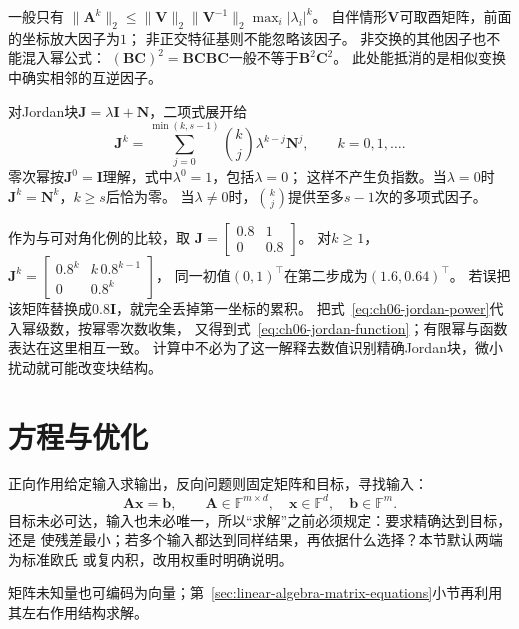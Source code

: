 一般只有
$\lVert\bm A^k\rVert_2\leq
\lVert\bm V\rVert_2\lVert\bm V^{-1}\rVert_2\max_i|\lambda_i|^k$。
自伴情形$\bm V$可取酉矩阵，前面的坐标放大因子为$1$；
非正交特征基则不能忽略该因子。
非交换的其他因子也不能混入幂公式：
$(\bm B\bm C)^2=\bm B\bm C\bm B\bm C$一般不等于$\bm B^2\bm C^2$。
此处能抵消的是相似变换中确实相邻的互逆因子。


对Jordan块$\bm J=\lambda\bm I+\bm N$，二项式展开给
\begin{equation}
 \bm J^k=\sum_{j=0}^{\min(k,s-1)}
       \binom{k}{j}\lambda^{k-j}\bm N^j,\qquad k=0,1,\ldots.
 \label{eq:ch06-jordan-power}
\end{equation}
零次幂按$\bm J^0=\bm I$理解，式中$\lambda^0=1$，包括$\lambda=0$；
这样不产生负指数。当$\lambda=0$时$\bm J^k=\bm N^k$，$k\geq s$后恰为零。
当$\lambda\neq0$时，$\binom{k}{j}$提供至多$s-1$次的多项式因子。

作为与可对角化例的比较，取
$\bm J=\left[\begin{smallmatrix}0.8&1\\0&0.8\end{smallmatrix}\right]$。
对$k\geq1$，
$\bm J^k=\left[\begin{smallmatrix}0.8^k&k\,0.8^{k-1}\\0&0.8^k\end{smallmatrix}\right]$，
同一初值$(0,1)^\top$在第二步成为$(1.6,0.64)^\top$。
若误把该矩阵替换成$0.8\bm I$，就完全丢掉第一坐标的累积。
把式~\eqref{eq:ch06-jordan-power}代入幂级数，按幂零次数收集，
又得到式~\eqref{eq:ch06-jordan-function}；有限幂与函数表达在这里相互一致。
计算中不必为了这一解释去数值识别精确Jordan块，微小扰动就可能改变块结构。

\section{方程与优化}
\label{sec:linear-algebra-reachability-solvability}

正向作用给定输入求输出，反向问题则固定矩阵和目标，寻找输入：
\begin{equation}
 \bm A\bm x=\bm b,\qquad
 \bm A\in\mathbb F^{m\times d},\quad
 \bm x\in\mathbb F^d,\quad\bm b\in\mathbb F^m.
 \label{eq:linear-algebra-linear-system}
\end{equation}
目标未必可达，输入也未必唯一，所以“求解”之前必须规定：要求精确达到目标，还是
使残差最小；若多个输入都达到同样结果，再依据什么选择？本节默认两端为标准欧氏
或复内积，改用权重时明确说明。

矩阵未知量也可编码为向量；第~\ref{sec:linear-algebra-matrix-equations}小节再利用其左右作用结构求解。

